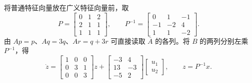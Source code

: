 将普通特征向量放在广义特征向量前，取
\[
P=\begin{bmatrix}0&1&2\\2&1&1\\1&1&1\end{bmatrix},\qquad
P^{-1}=\begin{bmatrix}0&1&-1\\-1&-2&4\\1&1&-2\end{bmatrix}.
\]
由 $Ap=p$、$Aq=3q$、$Ar=q+3r$ 可直接读取 $\bar A$ 的各列。将 $B$ 的两列分别左乘 $P^{-1}$，得
\[
\dot z=\begin{bmatrix}1&0&0\\0&3&1\\0&0&3\end{bmatrix}z+
\begin{bmatrix}-3&4\\13&-3\\-5&2\end{bmatrix}
\begin{bmatrix}u_1\\u_2\end{bmatrix},\qquad z=P^{-1}x.
\]



